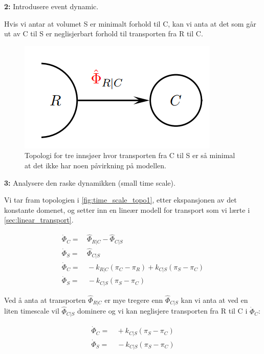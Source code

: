 \begin{center}
    \textbf{2:} Introdusere event dynamic.
\end{center}

Hvis vi antar at volumet S er minimalt forhold til C, kan vi anta at det som går ut av C til S er neglisjerbart forhold til transporten fra R til C.

\begin{figure}[H]
    \centering
    \includegraphics[scale=0.5]{Figures/time_scale_topo2.png}
    \caption{Topologi for tre innsjøer hvor transporten fra C til S er så minimal at det ikke har noen påvirkning på modellen.}
    \label{fig:time_scale_topo2}
\end{figure}



\begin{center}
    \textbf{3:} Analysere den raske dynamikken (small time scale).
\end{center}

Vi tar fram topologien i \cref{fig:time_scale_topo1}, etter ekspansjonen av det konstante domenet, og setter inn en lineær modell for transport som vi lærte i \cref{sec:linear_transport}.

\begin{align}
    \dot{\Phi}_C =&\, \hat{\Phi}_{R|C} - \hat{\Phi}_{C|S}\\
    \dot{\Phi}_S =&\, \hat{\Phi}_{C|S} \\[0.5cm]
    \dot{\Phi}_C =&\, -k_{R|C}(\pi_C-\pi_R) +k_{C|S}(\pi_S-\pi_C)\\
      \dot{\Phi}_S =&\ -k_{C|S}(\pi_S-\pi_C)
\end{align}

Ved å anta at transporten $\hat{\Phi}_{R|C}$ er mye tregere enn  $\hat{\Phi}_{C|S}$ kan vi anta at ved en liten timescale vil $\hat{\Phi}_{C|S}$ dominere og vi kan neglisjere transporten fra R til C i $\dot{\Phi}_C$:

\begin{align}
    \dot{\Phi}_C =&\, +k_{C|S}(\pi_S-\pi_C)\\
      \dot{\Phi}_S =&\ -k_{C|S}(\pi_S-\pi_C)
\end{align}

